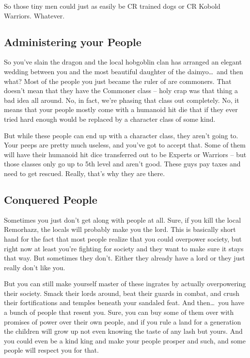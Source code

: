 So those tiny men could just as easily be CR \half trained dogs or CR \half Kobold Warriors. Whatever.

\subsection{Administering your People}
\vspace*{-8pt}

So you've slain the dragon and the local hobgoblin clan has arranged an elegant wedding between you and the most beautiful daughter of the daimyo\ldots\  and then what? Most of the people you just became the ruler of are commoners. That doesn't mean that they have the Commoner class -- holy crap was that thing a bad idea all around. No, in fact, we're phasing that class out completely. No, it means that your people mostly come with a humanoid hit die that if they ever tried hard enough would be replaced by a character class of some kind.

But while these people can end up with a character class, they aren't going to. Your peeps are pretty much useless, and you've got to accept that. Some of them will have their humanoid hit dice transferred out to be Experts or Warriors -- but those classes only go up to 5th level and aren't good. These guys pay taxes and need to get rescued. Really, that's why they are there.

\subsection{Conquered People}
\vspace*{-8pt}

Sometimes you just don't get along with people at all. Sure, if you kill the local Remorhazz, the locals will probably make you the lord. This is basically short hand for the fact that most people realize that you could overpower society, but right now at least you're fighting for society and they want to make sure it stays that way. But sometimes they don't. Either they already have a lord or they just really don't like you.

But you can still make yourself master of these ingrates by actually overpowering their society. Smack their lords around, beat their guards in combat, and crush their fortifications and temples beneath your sandaled feat. And then\ldots\  you have a bunch of people that resent you. Sure, you can buy some of them over with promises of power over their own people, and if you rule a land for a generation the children will grow up not even knowing the taste of any lash but yours. And you could even be a kind king and make your people prosper and such, and some people will respect you for that.

